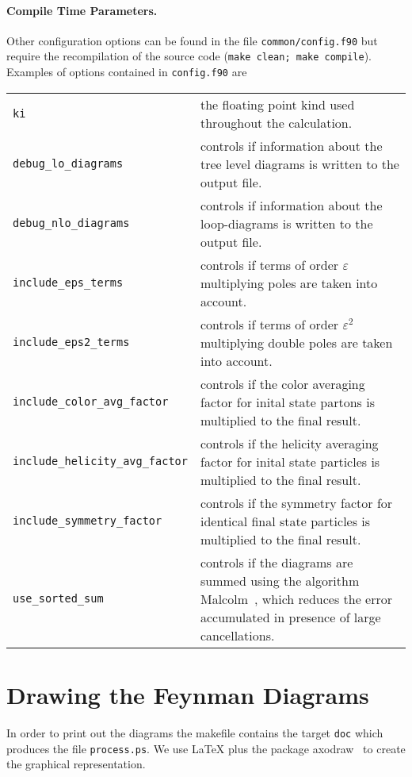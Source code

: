\documentclass[11pt,a4paper]{refrep}
\begin{document}
\paragraph{Compile Time Parameters.}
Other configuration options can be found in the file \texttt{common/config.f90}
but require the recompilation of the source code
(\texttt{make clean; make compile}).
\smallskip
Examples of options contained in \texttt{config.f90} are
\begin{maxipage}
\begin{tabular}{lp{}}
\texttt{ki} & the floating point kind used throughout the calculation.\\
\texttt{debug\_lo\_diagrams} & controls if information about the
    tree level diagrams is written to the output file.\\
\texttt{debug\_nlo\_diagrams} & controls if information about the
    loop-diagrams is written to the output file.\\
\texttt{include\_eps\_terms} & controls if
    terms of order $\varepsilon$ multiplying
    poles are taken into account.\\
\texttt{include\_eps2\_terms} & controls if
    terms of order $\varepsilon^2$ multiplying
    double poles are taken into account.\\
\texttt{include\_color\_avg\_factor} & controls if the color averaging
    factor for inital state partons is multiplied to the final result.\\
\texttt{include\_helicity\_avg\_factor} & controls if the helicity averaging
    factor for inital state particles is multiplied to the final result.\\
\texttt{include\_symmetry\_factor} & controls if the symmetry
    factor for identical final state particles
    is multiplied to the final result. \\
\texttt{use\_sorted\_sum} & controls if the diagrams are summed using
    the algorithm Malcolm~\cite{Malcolm:1970}, which reduces the error
    accumulated in presence of large cancellations.
\end{tabular}
\end{maxipage}

\section{Drawing the Feynman Diagrams}
In order to print out the diagrams the makefile contains the target
\texttt{doc} which produces the file \texttt{process.ps}.
We use \LaTeX{} plus the package \textsf{axodraw}~\cite{Vermaseren:1994je}
to create the graphical representation.
\end{document}
